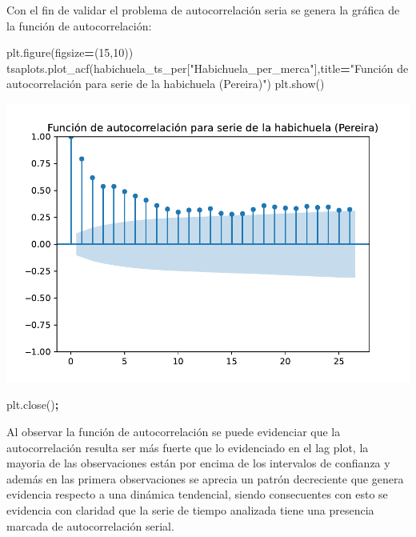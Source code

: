 \documentclass[
]{book}
\newenvironment{Shaded}{\begin{snugshade}}{\end{snugshade}}
\newcommand{\DecValTok}[1]{\textcolor[rgb]{0.00,0.00,0.81}{#1}}
\newcommand{\NormalTok}[1]{#1}
\newcommand{\OperatorTok}[1]{\textcolor[rgb]{0.81,0.36,0.00}{\textbf{#1}}}
\newcommand{\StringTok}[1]{\textcolor[rgb]{0.31,0.60,0.02}{#1}}
\begin{document}
Con el fin de validar el problema de autocorrelación seria se genera la gráfica de la función de autocorrelación:

\begin{Shaded}
\begin{Highlighting}[]

\NormalTok{plt.figure(figsize}\OperatorTok{=}\NormalTok{(}\DecValTok{15}\NormalTok{,}\DecValTok{10}\NormalTok{))}
\NormalTok{tsaplots.plot\_acf(habichuela\_ts\_per[}\StringTok{"Habichuela\_per\_merca"}\NormalTok{],title}\OperatorTok{=}\StringTok{"Función de autocorrelación para serie de la habichuela (Pereira)"}\NormalTok{)}
\NormalTok{plt.show()}
\end{Highlighting}
\end{Shaded}

\includegraphics{bookdown-demo_files/figure-latex/unnamed-chunk-107-89.pdf}

\begin{Shaded}
\begin{Highlighting}[]
\NormalTok{plt.close()}\OperatorTok{;}
\end{Highlighting}
\end{Shaded}

Al observar la función de autocorrelación se puede evidenciar que la autocorrelación resulta ser más fuerte que lo evidenciado en el lag plot, la mayoria de las observaciones están por encima de los intervalos de confianza y además en las primera observaciones se aprecia un patrón decreciente que genera evidencia respecto a una dinámica tendencial, siendo consecuentes con esto se evidencia con claridad que la serie de tiempo analizada tiene una presencia marcada de autocorrelación serial.
\end{document}
